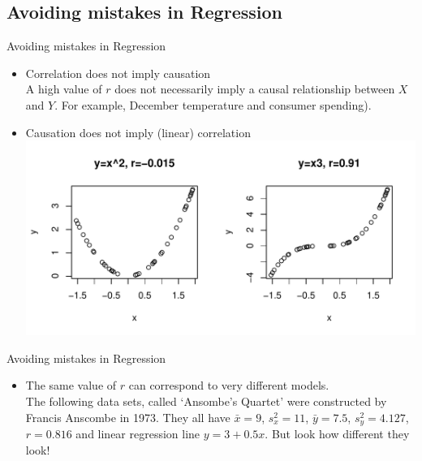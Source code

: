 \documentclass[t,xcolor=pdftex,dvipsnames,table]{beamer}\usepackage[]{graphicx}\usepackage[]{color}
\makeatletter
\def\maxwidth{ %
  \ifdim\Gin@nat@width>\linewidth
    \linewidth
  \else
    \Gin@nat@width
  \fi
}
\newenvironment{knitrout}{}{} %
\makeatother
\begin{document}
\subsection{Avoiding mistakes in Regression}
\begin{frame}[fragile]{Avoiding mistakes in Regression}

\begin{itemize}
\item Correlation does not imply causation \\
A high value of $r$ does not necessarily imply a causal relationship between $X$ and $Y$.  For example, December temperature and consumer spending).

\vspace{.5cm}
\item Causation does not imply (linear) correlation \\

\begin{knitrout}
\color{fgcolor}
\includegraphics[width=\maxwidth]{figure/unnamed-chunk-53-1} 

\end{knitrout}
\end{itemize}
\end{frame} 


\begin{frame}[fragile]{Avoiding mistakes in Regression}
\begin{itemize}
\item The same value of $r$ can correspond to very different models.  \\

\vspace{.5cm}
The following data sets, called `Ansombe's Quartet' were constructed by Francis Anscombe in 1973. They all have $\bar{x}= 9$, $s_{x}^2=11$, $\bar{y} = 7.5$, $s_{y}^2 = 4.127$, $r=0.816$ and linear regression line $y=3+0.5x$. But look how different they look!
\end{itemize}

\href{https://en.wikipedia.org/wiki/Anscombes_quartet}{}

\href{http://data.heapanalytics.com/anscombes-quartet-and-why-summary-statistics-dont-tell-the-whole-story}{}  %
\end{frame} 
\end{document}
